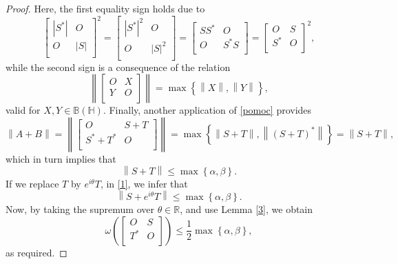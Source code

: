 \documentclass[12pt,twoside,reqno]{amsart}
\numberwithin{equation}{section}
\begin{document}
\begin{proof}
Here, the first equality sign holds due to
$$
\left[ \begin{matrix}
   |S^{*}|& O  \\
   O & |S|  \\
\end{matrix} \right]^{2}=\left[ \begin{matrix}
   |S^{*}|^{2}& O  \\
   O & |S|^{2}  \\
\end{matrix} \right]=\left[ \begin{matrix}
   SS^{*}& O  \\
   O & S^{*}S  \\
\end{matrix} \right]=\left[ \begin{matrix}
   O& S  \\
   S^{*} & O  \\
\end{matrix} \right]^{2},
$$
while the second  sign is a consequence of the relation
\begin{equation}\label{pomoc}\left\| \left[ \begin{matrix}
   O & X  \\
   Y & O  \\
\end{matrix} \right] \right\|=\max \left\{ \left\| X \right\|,\left\| Y \right\| \right\},
\end{equation}
valid for $X,Y\in \mathbb B\left( \mathbb H \right)$. Finally, another application of \eqref{pomoc}
provides
$$
 \left\| A+B \right\|=\left\| \left[ \begin{matrix}
   O & S+T  \\
   {{S}^{*}}+{{T}^{*}} & O  \\
\end{matrix} \right] \right\|=\max \left\{ \left\| S+T \right\|,\left\| (S+T)^{*} \right\| \right\}=\left\| S+T \right\|,
$$
which in turn implies that
\begin{equation}\label{1}
\left\| S+T \right\|\le \max \left\{ \alpha ,\beta  \right\}.
\end{equation}
If we replace $T$ by ${{e}^{i\theta }}T$, in \eqref{1}, we infer that
\[\left\| S+{{e}^{i\theta }}T \right\|\le \max \left\{ \alpha ,\beta  \right\}.\]
Now, by taking the supremum over $\theta \in \mathbb{R}$, and use Lemma \ref{3}, we obtain
\[\omega \left( \left[ \begin{matrix}
   O & S  \\
   {{T}^{*}} & O  \\
\end{matrix} \right] \right)\le \frac{1}{2}\max \left\{ \alpha ,\beta  \right\},\]
as required.
\end{proof}
\end{document}
